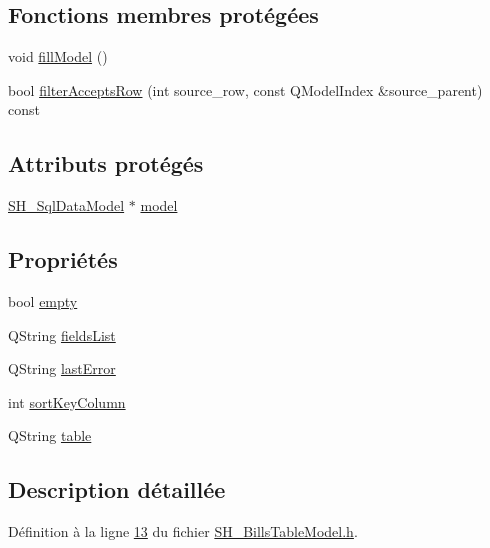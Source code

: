 \subsection*{Fonctions membres protégées}
\begin{DoxyCompactItemize}
\item 
void \hyperlink{classSH__BillsTableModel_aca5a0247db0eb52036c1c681c0f1f1ed}{fill\-Model} ()
\item 
bool \hyperlink{classSH__ExtendedProxyModel_a5c9a68f10afb83af24896beac56e0ae3}{filter\-Accepts\-Row} (int source\-\_\-row, const Q\-Model\-Index \&source\-\_\-parent) const 
\end{DoxyCompactItemize}
\subsection*{Attributs protégés}
\begin{DoxyCompactItemize}
\item 
\hyperlink{classSH__SqlDataModel}{S\-H\-\_\-\-Sql\-Data\-Model} $\ast$ \hyperlink{classSH__ExtendedProxyModel_a8c8b8930c6b1abd9bbb1dce1fdc9690b}{model}
\end{DoxyCompactItemize}
\subsection*{Propriétés}
\begin{DoxyCompactItemize}
\item 
bool \hyperlink{classSH__ExtendedProxyModel_a9e22d17af7776aca8052084cc33c3442}{empty}
\item 
Q\-String \hyperlink{classSH__ExtendedProxyModel_a15e779ba92384a57442d6bd79ef3d1d1}{fields\-List}
\item 
Q\-String \hyperlink{classSH__ExtendedProxyModel_a1597853dfae8c3972ef3396293d5d0fc}{last\-Error}
\item 
int \hyperlink{classSH__ExtendedProxyModel_a47e2d0b99b84fb066438db667dd1ad26}{sort\-Key\-Column}
\item 
Q\-String \hyperlink{classSH__ExtendedProxyModel_a7eef4557a77444e9ce5c24c180392bfa}{table}
\end{DoxyCompactItemize}


\subsection{Description détaillée}


Définition à la ligne \hyperlink{SH__BillsTableModel_8h_source_l00013}{13} du fichier \hyperlink{SH__BillsTableModel_8h_source}{S\-H\-\_\-\-Bills\-Table\-Model.\-h}.



